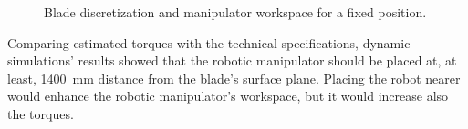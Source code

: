 \begin{figure}
	\centering
	\quad
	\caption{Blade discretization and manipulator workspace for a fixed position.}
\end{figure}

Comparing estimated torques with the technical specifications, dynamic
simulations' results showed that the robotic manipulator should be placed at,
at least, 1400~mm distance from the blade's surface plane. Placing the robot
nearer would enhance the robotic manipulator's workspace, but it would increase
also the torques. 

